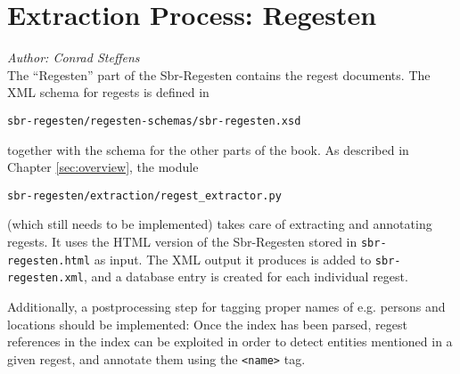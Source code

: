 \section{Extraction Process: Regesten}
\label{sec:regesten}

\emph{Author: Conrad Steffens} \\

The ``Regesten'' part of the Sbr-Regesten contains the regest
documents. The XML schema for regests is defined in

\begin{verbatim}
sbr-regesten/regesten-schemas/sbr-regesten.xsd
\end{verbatim}

together with the schema for the other parts of the book. As described
in Chapter \ref{sec:overview}, the module

\begin{verbatim}
sbr-regesten/extraction/regest_extractor.py
\end{verbatim}

(which still needs to be implemented) takes care of extracting
and annotating regests. It uses the HTML version of the Sbr-Regesten
stored in \texttt{sbr-regesten.html} as input. The XML output it
produces is added to \texttt{sbr-regesten.xml}, and a database entry
is created for each individual regest.

Additionally, a postprocessing step for tagging proper names of e.g.
persons and locations should be implemented: Once the index has been
parsed, regest references in the index can be exploited in order to
detect entities mentioned in a given regest, and annotate them using
the \texttt{<name>} tag.
